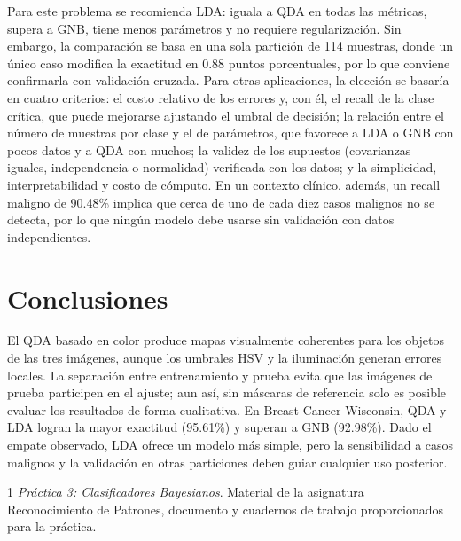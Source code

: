 \documentclass[conference]{IEEEtran}
\begin{document}
Para este problema se recomienda LDA: iguala a QDA en todas las métricas, supera a GNB, tiene menos parámetros y no requiere regularización. Sin embargo, la comparación se basa en una sola partición de 114 muestras, donde un único caso modifica la exactitud en 0.88 puntos porcentuales, por lo que conviene confirmarla con validación cruzada. Para otras aplicaciones, la elección se basaría en cuatro criterios: el costo relativo de los errores y, con él, el recall de la clase crítica, que puede mejorarse ajustando el umbral de decisión; la relación entre el número de muestras por clase y el de parámetros, que favorece a LDA o GNB con pocos datos y a QDA con muchos; la validez de los supuestos (covarianzas iguales, independencia o normalidad) verificada con los datos; y la simplicidad, interpretabilidad y costo de cómputo. En un contexto clínico, además, un recall maligno de 90.48\% implica que cerca de uno de cada diez casos malignos no se detecta, por lo que ningún modelo debe usarse sin validación con datos independientes.

\section{Conclusiones}
El QDA basado en color produce mapas visualmente coherentes para los objetos de las tres imágenes, aunque los umbrales HSV y la iluminación generan errores locales. La separación entre entrenamiento y prueba evita que las imágenes de prueba participen en el ajuste; aun así, sin máscaras de referencia solo es posible evaluar los resultados de forma cualitativa. En Breast Cancer Wisconsin, QDA y LDA logran la mayor exactitud (95.61\%) y superan a GNB (92.98\%). Dado el empate observado, LDA ofrece un modelo más simple, pero la sensibilidad a casos malignos y la validación en otras particiones deben guiar cualquier uso posterior.

\begin{thebibliography}{1}
\emph{Práctica 3: Clasificadores Bayesianos}. Material de la asignatura Reconocimiento de Patrones, documento y cuadernos de trabajo proporcionados para la práctica.
\end{thebibliography}
\end{document}
